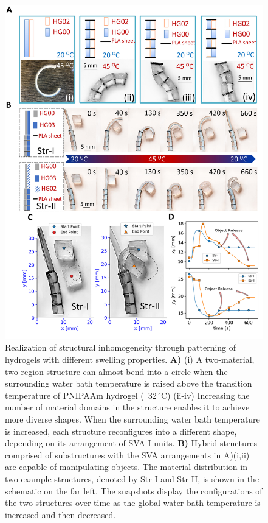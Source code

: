 \begin{figure}[t]
\centering
\includegraphics[width=\textwidth]{fig3.pdf}
\caption[Realization of structural inhomogeneity]{Realization of structural inhomogeneity through patterning of hydrogels with different swelling properties. \textbf{A)} (i) A two-material, two-region structure can almost bend into a circle when the surrounding water bath temperature is raised  above the transition temperature of PNIPAAm hydrogel (~32\,$^{\circ}$C) (ii-iv) Increasing the number of material domains in the structure enables it to achieve more diverse shapes. When the surrounding water bath temperature is increased, each structure reconfigures into a different shape, depending on its arrangement of SVA-I units. \textbf{B)} Hybrid structures comprised of substructures with the SVA arrangements in A)(i,ii) are
capable of manipulating objects. The material distribution in two example structures, denoted by Str-I and Str-II, is shown in the schematic on the far left. The snapshots display the configurations of the two structures over time as the global water bath temperature is increased and then decreased.
}
\end{figure}

